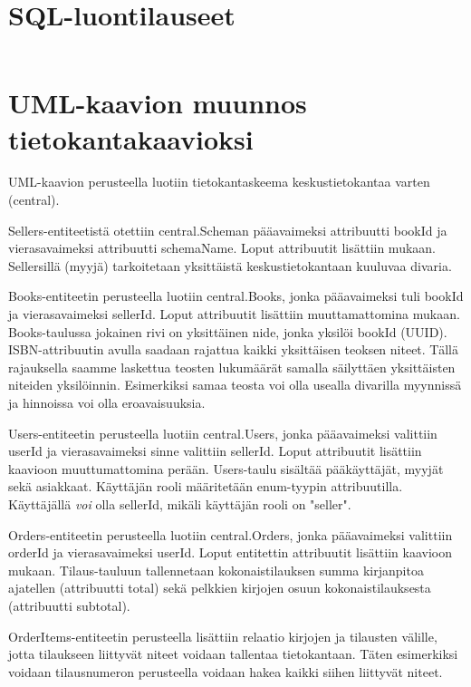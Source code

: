 \documentclass[11pt,a4paper]{article}
\begin{document}
\section{SQL-luontilauseet}
\inputminted{sql}{assets/create.sql}

\section{UML-kaavion muunnos tietokantakaavioksi}

UML-kaavion perusteella luotiin tietokantaskeema keskustietokantaa varten (central).

Sellers-entiteetistä otettiin central.Scheman pääavaimeksi attribuutti bookId ja vierasavaimeksi attribuutti schemaName. Loput attribuutit lisättiin mukaan. Sellersillä (myyjä) tarkoitetaan yksittäistä keskustietokantaan kuuluvaa divaria.

Books-entiteetin perusteella luotiin central.Books, jonka pääavaimeksi tuli bookId ja vierasavaimeksi sellerId. Loput attribuutit lisättiin muuttamattomina mukaan. Books-taulussa jokainen rivi on yksittäinen nide, jonka yksilöi bookId (UUID). ISBN-attribuutin avulla saadaan rajattua kaikki yksittäisen teoksen niteet. Tällä rajauksella saamme laskettua teosten lukumäärät samalla säilyttäen yksittäisten niteiden yksilöinnin. Esimerkiksi samaa teosta voi olla usealla divarilla myynnissä ja hinnoissa voi olla eroavaisuuksia.

Users-entiteetin perusteella luotiin central.Users, jonka pääavaimeksi valittiin userId ja vierasavaimeksi sinne valittiin sellerId. Loput attribuutit lisättiin kaavioon muuttumattomina perään. Users-taulu sisältää pääkäyttäjät, myyjät sekä asiakkaat. Käyttäjän rooli määritetään enum-tyypin attribuutilla. Käyttäjällä \textit{voi} olla sellerId, mikäli käyttäjän rooli on "seller".

Orders-entiteetin perusteella luotiin central.Orders, jonka pääavaimeksi valittiin orderId ja vierasavaimeksi userId. Loput entitettin attribuutit lisättiin kaavioon mukaan. Tilaus-tauluun tallennetaan kokonaistilauksen summa kirjanpitoa ajatellen (attribuutti total) sekä pelkkien kirjojen osuun kokonaistilauksesta (attribuutti subtotal).

OrderItems-entiteetin perusteella lisättiin relaatio kirjojen ja tilausten välille, jotta tilaukseen liittyvät niteet voidaan tallentaa tietokantaan. Täten esimerkiksi voidaan tilausnumeron perusteella voidaan hakea kaikki siihen liittyvät niteet.
\end{document}
